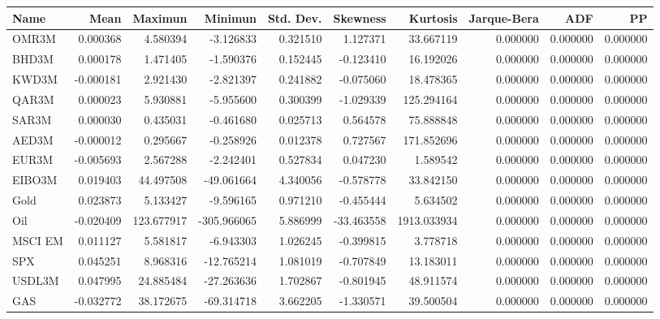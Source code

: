 \begin{tabular}{lrrrrrrrrr}
\toprule
Name & Mean & Maximun & Minimun & Std. Dev. & Skewness & Kurtosis & Jarque-Bera & ADF & PP \\
\midrule
OMR3M & 0.000368 & 4.580394 & -3.126833 & 0.321510 & 1.127371 & 33.667119 & 0.000000 & 0.000000 & 0.000000 \\
BHD3M & 0.000178 & 1.471405 & -1.590376 & 0.152445 & -0.123410 & 16.192026 & 0.000000 & 0.000000 & 0.000000 \\
KWD3M & -0.000181 & 2.921430 & -2.821397 & 0.241882 & -0.075060 & 18.478365 & 0.000000 & 0.000000 & 0.000000 \\
QAR3M & 0.000023 & 5.930881 & -5.955600 & 0.300399 & -1.029339 & 125.294164 & 0.000000 & 0.000000 & 0.000000 \\
SAR3M & 0.000030 & 0.435031 & -0.461680 & 0.025713 & 0.564578 & 75.888848 & 0.000000 & 0.000000 & 0.000000 \\
AED3M & -0.000012 & 0.295667 & -0.258926 & 0.012378 & 0.727567 & 171.852696 & 0.000000 & 0.000000 & 0.000000 \\
EUR3M & -0.005693 & 2.567288 & -2.242401 & 0.527834 & 0.047230 & 1.589542 & 0.000000 & 0.000000 & 0.000000 \\
EIBO3M & 0.019403 & 44.497508 & -49.061664 & 4.340056 & -0.578778 & 33.842150 & 0.000000 & 0.000000 & 0.000000 \\
Gold & 0.023873 & 5.133427 & -9.596165 & 0.971210 & -0.455444 & 5.634502 & 0.000000 & 0.000000 & 0.000000 \\
Oil & -0.020409 & 123.677917 & -305.966065 & 5.886999 & -33.463558 & 1913.033934 & 0.000000 & 0.000000 & 0.000000 \\
MSCI EM & 0.011127 & 5.581817 & -6.943303 & 1.026245 & -0.399815 & 3.778718 & 0.000000 & 0.000000 & 0.000000 \\
SPX & 0.045251 & 8.968316 & -12.765214 & 1.081019 & -0.707849 & 13.183011 & 0.000000 & 0.000000 & 0.000000 \\
USDL3M & 0.047995 & 24.885484 & -27.263636 & 1.702867 & -0.801945 & 48.911574 & 0.000000 & 0.000000 & 0.000000 \\
GAS & -0.032772 & 38.172675 & -69.314718 & 3.662205 & -1.330571 & 39.500504 & 0.000000 & 0.000000 & 0.000000 \\
\bottomrule
\end{tabular}
